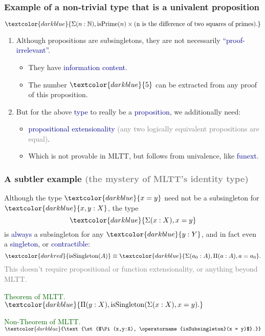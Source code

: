 \documentclass[aspectratio=169]{beamer}
\newcommand{\isPrime}{\operatorname{isPrime}}
\newcommand{\isSubsingleton}{\operatorname{isSubsingleton}}
\newcommand{\isSingleton}{\operatorname{isSingleton}}
\newcommand{\eqq}{\equiv}
\newcommand{\db}{\textcolor{darkblue}}
\newcommand{\dg}{\textcolor{darkgreen}}
\newcommand{\grey}{\textcolor{grey}}
\newcommand{\dr}{\textcolor{darkred}}
\newcommand{\m}[1]{$\db{#1}$}
\newcommand{\M}[1]{\[\db{#1}\]}
\newcommand{\N}{\mathbb{N}}
\begin{document}
\begin{frame}
  \frametitle{Example of a non-trivial type that is a univalent proposition}

\M{\Sigma(n:\N), \isPrime(n) \times \text{(n is the difference of two squares of primes).}}

\begin{enumerate}
\vfill \item Although propositions are subsingletons, they are not necessarily \db{``proof-irrelevant''}.
\begin{itemize}
\vfill \item They have \db{information content}.
\vfill \item The number \m{5} can be extracted from any proof of this proposition.
\end{itemize}

\vfill \item But for the above \db{type} to really be a \db{proposition}, we additionally need:
  \begin{itemize}
\vfill \item \db{propositional extensionality} \grey{(any two logically equivalent
propositions are equal)}.
\vfill \item Which is not provable in MLTT, but follows from univalence, like \db{funext}.
\end{itemize}

\end{enumerate}

\vfill
\end{frame}

\begin{frame}
  \frametitle{A subtler example \grey{(the mystery of MLTT's identity type)}}

Although the type \m{x=y} need not be a subsingleton for \m{x,y:X}, the type
\M{\Sigma(x:X), x = y}
is \db{always} a subsingleton for any \m{y:Y}, and in fact even a \db{singleton}, or \db{contractible}:
\[
\dr{\isSingleton(A)} \eqq \db{\Sigma(a_0:A), \Pi(a:A), a = a_0}.
\]
\grey{This doesn't require propositional or function extensionality, or anything beyond MLTT.}

\vfill

\dg{Theorem of MLTT.} \m{\Pi(y:X), \isSingleton(\Sigma(x:X), x = y).}

\vfill

\dg{Non-Theorem of MLTT.} \m{\text{\st{$\Pi(x,y:X), \isSubsingleton(x = y)$}.}}

\end{frame}
\end{document}
